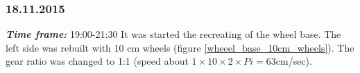 \subsubsection{18.11.2015}
\textit{\textbf{Time frame:}} 19:00-21:30 \newline
It was started the recreating of the wheel base. The left side was rebuilt with 10 cm wheels (figure \ref{wheeel_base_10cm_wheels}). The gear ratio was changed to 1:1 (speed about $1 \times 10 \times 2 \times Pi = 63$cm/sec). 

